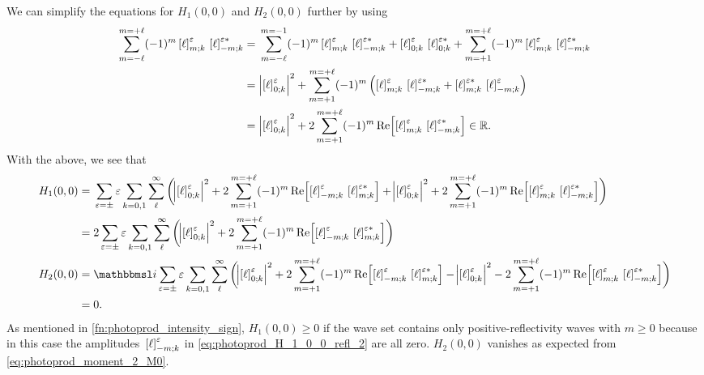We can simplify the equations for $H_1(0, 0)$ and $H_2(0, 0)$ further
by using
\begin{align}
  \sum_{m = -\ell}^{m = +\ell}
  (-1)^m \sBrk{\ell}^\refl_{m; k}\, \sBrk{\ell}^{\refl *}_{{-m}; k}
  ={}& \sum_{m = -\ell}^{m = -1}
  (-1)^m \sBrk{\ell}^\refl_{m; k}\, \sBrk{\ell}^{\refl *}_{{-m}; k}
  + \sBrk{\ell}^\refl_{0; k}\, \sBrk{\ell}^{\refl *}_{0; k}
  + \sum_{m = +1}^{m = +\ell}
  (-1)^m \sBrk{\ell}^\refl_{m; k}\, \sBrk{\ell}^{\refl *}_{{-m}; k} \nonumber
  \\
  ={}& \Abs[2]{\sBrk{\ell}^\refl_{0; k}}^2
  + \sum_{m = +1}^{m = +\ell}
  (-1)^m \rBrk[2]{\sBrk{\ell}^\refl_{m; k}\, \sBrk{\ell}^{\refl *}_{{-m}; k} + \sBrk{\ell}^{\refl *}_{m; k}\, \sBrk{\ell}^\refl_{{-m}; k}} \nonumber
  \\
  ={}& \Abs[2]{\sBrk{\ell}^\refl_{0; k}}^2
  + 2 \sum_{m = +1}^{m = +\ell}
  (-1)^m \Re[2]{\sBrk{\ell}^\refl_{m; k}\, \sBrk{\ell}^{\refl *}_{{-m}; k}}
  \in \mathbb{R}.
\end{align}
With the above, we see that
\begin{align}
  H_1(0, 0)
  ={}& \sum_{\refl = \pm} \refl \sum_{k = 0, 1} \sum_{\ell}^\infty
  \rBrk[3]{\Abs[2]{\sBrk{\ell}^\refl_{0; k}}^2
  + 2 \sum_{m = +1}^{m = +\ell}
  (-1)^m \Re[2]{\sBrk{\ell}^\refl_{{-m}; k}\, \sBrk{\ell}^{\refl *}_{m; k}}
  + \Abs[2]{\sBrk{\ell}^\refl_{0; k}}^2
  + 2 \sum_{m = +1}^{m = +\ell}
  (-1)^m \Re[2]{\sBrk{\ell}^\refl_{m; k}\, \sBrk{\ell}^{\refl *}_{{-m}; k}}} \nonumber
  \\
  \label{eq:photoprod_H_1_0_0_refl_2}
  ={}& 2 \sum_{\refl = \pm} \refl \sum_{k = 0, 1} \sum_{\ell}^\infty
  \rBrk[3]{\Abs[2]{\sBrk{\ell}^\refl_{0; k}}^2
  + 2 \sum_{m = +1}^{m = +\ell}
  (-1)^m \Re[2]{\sBrk{\ell}^\refl_{{-m}; k}\, \sBrk{\ell}^{\refl *}_{m; k}}}
  \\
  H_2(0, 0)
  ={}& \imag \sum_{\refl = \pm} \refl \sum_{k = 0, 1} \sum_{\ell}^\infty
  \rBrk[3]{\Abs[2]{\sBrk{\ell}^\refl_{0; k}}^2
  + 2 \sum_{m = +1}^{m = +\ell}
  (-1)^m \Re[2]{\sBrk{\ell}^\refl_{{-m}; k}\, \sBrk{\ell}^{\refl *}_{m; k}}
  - \Abs[2]{\sBrk{\ell}^\refl_{0; k}}^2
  - 2 \sum_{m = +1}^{m = +\ell}
  (-1)^m \Re[2]{\sBrk{\ell}^\refl_{m; k}\, \sBrk{\ell}^{\refl *}_{{-m}; k}}} \nonumber
  \\
  ={}& 0.
\end{align}
As mentioned in \cref{fn:photoprod_intensity_sign}, $H_1(0, 0) \geq 0$
if the wave set contains only positive-reflectivity waves with $m \geq
0$ because in this case the amplitudes~$\sBrk{\ell}^\refl_{{-m}; k}$ in
\cref{eq:photoprod_H_1_0_0_refl_2} are all zero.  $H_2(0, 0)$ vanishes
as expected from \cref{eq:photoprod_moment_2_M0}.


